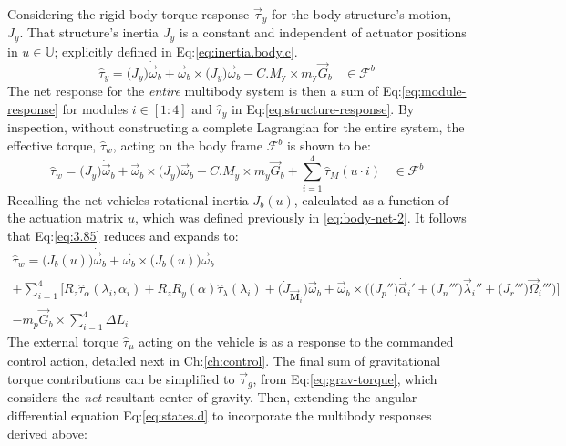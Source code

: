 Considering the rigid body torque response $\vec{\tau}_y$ for the body structure's motion, $J_y$. That structure's inertia $J_y$ is a constant and independent of actuator positions in $u\in\mathbb{U}$; explicitly defined in Eq:\ref{eq:inertia.body.c}.
\begin{equation}\label{eq:structure-response}
\hat{\tau}_y=\big(J_y\big)\dot{\vec{\omega}}_b+\vec{\omega}_b\times\big(J_y\big)\vec{\omega}_b-C.M_\text{y}\times m_\text{y}\vec{G}_b~~~~\in\mathcal{F}^b
\end{equation}
The net response for the \emph{entire} multibody system is then a sum of Eq:\ref{eq:module-response} for modules $i\in[1:4]$ and $\hat{\tau}_y$ in Eq:\ref{eq:structure-response}. By inspection, without constructing a complete Lagrangian for the entire system, the effective torque, $\hat{\tau}_{w}$, acting on the body frame $\mathcal{F}^b$ is shown to be:
\begin{equation}\label{eq:3.85}
\hat{\tau}_w = \big(J_y\big)\dot{\vec{\omega}}_b+\vec{\omega}_b\times\big(J_y\big)\vec{\omega}_b-C.M_y\times m_y\vec{G}_b+\sum_{i=1}^{4}\hat{\tau}_{M}(u\cdot i)~~~~\in\mathcal{F}^b
\end{equation}
Recalling the net vehicles rotational inertia $J_b(u)$, calculated as a function of the actuation matrix $u$, which was defined previously in \ref{eq:body-net-2}. It follows that Eq:\ref{eq:3.85} reduces and expands to:
\begin{multline}\label{eq:3.109}
\hat{\tau}_w=\big(J_b(u)\big)\dot{\vec{\omega}}_b+\vec{\omega}_b\times\big(J_b(u)\big)\vec{\omega}_b
\\
+\sum_{i=1}^{4}\Big[R_z\hat{\tau}_\alpha(\lambda_i,\alpha_i)+R_zR_y(\alpha)\hat{\tau}_\lambda(\lambda_i)+\big(\dot{J}_{\vec{\mathbf{M}}_i}\big)\vec{\omega}_b+\vec{\omega}_b\times\Big(\big(J_p''\big)\dot{\vec{\alpha}}_i'+\big(J_n'''\big)\dot{\vec{\lambda}}_i''+\big(J_r'''\big)\vec{\Omega}_i'''\Big)\Big]
\\
-m_p\vec{G}_b\times\sum_{i=1}^{4}\Delta L_i
\end{multline}
The external torque $\hat{\tau}_{\mu}$ acting on the vehicle is as a response to the commanded control action, detailed next in Ch:\ref{ch:control}. The final sum of gravitational torque contributions can be simplified to $\vec{\tau}_g$, from Eq:\ref{eq:grav-torque}, which considers the \emph{net} resultant center of gravity. Then, extending the angular differential equation Eq:\ref{eq:states.d} to incorporate the multibody responses derived above:
